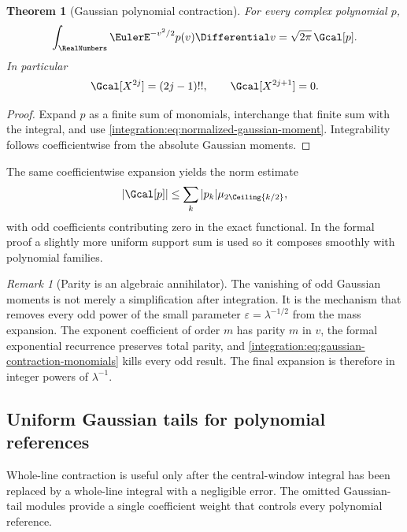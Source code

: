 \documentclass[11pt,oneside]{article}
\newtheorem{theorem}{Theorem}[section]
\theoremstyle{definition}
\theoremstyle{remark}
\newtheorem{remark}[remark]{Remark}
\begin{document}
\begin{theorem}[Gaussian polynomial contraction]
\label{integration:thm:gaussian-contraction}
For every complex polynomial $p$,
\begin{equation}
 \int_{\RealNumbers}\EulerE^{-v^2/2}p(v)\Differential v
 =\sqrt{2\pi}\,\Gcal[p].
 \label{integration:eq:gaussian-contraction-integral}
\end{equation}
In particular
\begin{equation}
 \Gcal[X^{2j}]=(2j-1)!!,
 \qquad
 \Gcal[X^{2j+1}]=0.
 \label{integration:eq:gaussian-contraction-monomials}
\end{equation}
\end{theorem}

\begin{proof}
Expand $p$ as a finite sum of monomials, interchange that finite sum with the integral, and
use \eqref{integration:eq:normalized-gaussian-moment}.  Integrability follows coefficientwise from the
absolute Gaussian moments.
\end{proof}

The same coefficientwise expansion yields the norm estimate
\begin{equation}
 \left|\Gcal[p]\right|
 \le\sum_k|p_k|\mu_{2\Ceiling{k/2}},
 \label{integration:eq:gaussian-contraction-norm-bound}
\end{equation}
with odd coefficients contributing zero in the exact functional.  In the formal proof a
slightly more uniform support sum is used so it composes smoothly with polynomial families.

\begin{remark}[Parity is an algebraic annihilator]
The vanishing of odd Gaussian moments is not merely a simplification after integration.  It
is the mechanism that removes every odd power of the small parameter $\varepsilon=
\lambda^{-1/2}$ from the mass expansion.  The exponent coefficient of order $m$ has parity
$m$ in $v$, the formal exponential recurrence preserves total parity, and
\eqref{integration:eq:gaussian-contraction-monomials} kills every odd result.  The final expansion is
therefore in integer powers of $\lambda^{-1}$.
\end{remark}

\subsection{Uniform Gaussian tails for polynomial references}
\label{integration:sec:gaussian-tails}

Whole-line contraction is useful only after the central-window integral has been replaced by
a whole-line integral with a negligible error.  The omitted Gaussian-tail modules provide a
single coefficient weight that controls every polynomial reference.
\end{document}

